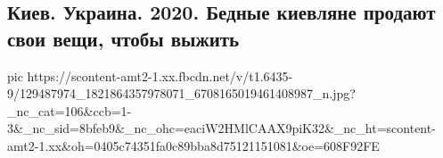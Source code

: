  
 
 
 
 

\subsection{Киев. Украина. 2020. Бедные киевляне продают свои вещи, чтобы выжить}

\ifcmt
  pic https://scontent-amt2-1.xx.fbcdn.net/v/t1.6435-9/129487974_1821864357978071_6708165019461408987_n.jpg?_nc_cat=106&ccb=1-3&_nc_sid=8bfeb9&_nc_ohc=eaciW2HMlCAAX9piK32&_nc_ht=scontent-amt2-1.xx&oh=0405c74351fa0c89bba8d75121151081&oe=608F92FE
\fi

